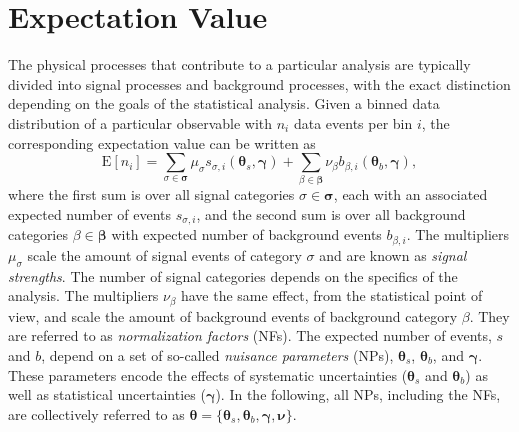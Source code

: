 \section{Expectation Value}
\label{sec:exp-value}
The physical processes that contribute to a particular analysis are typically divided into signal processes and background processes, with the exact distinction depending on the goals of the statistical analysis.
Given a binned data distribution of a particular observable with $n_i$ data events per bin $i$, the corresponding expectation value can be written as
\begin{equation}
    \text{E}[n_i] = \sum_{\sigma \in \pmb{\sigma}} \mu_\sigma s_{\sigma,i}(\pmb{\theta}_s, \pmb{\gamma}) + \sum_{\beta \in \pmb{\beta}} \nu_\beta b_{\beta,i}(\pmb{\theta}_b, \pmb{\gamma}),
\end{equation}
where the first sum is over all signal categories $\sigma \in \pmb{\sigma}$, each with an associated expected number of events $s_{\sigma, i}$, and the second sum is over all background categories $\beta \in \pmb{\beta}$ with expected number of background events $b_{\beta,i}$. 
The multipliers $\mu_\sigma$ scale the amount of signal events of category $\sigma$ and are known as \emph{signal strengths}. 
The number of signal categories depends on the specifics of the analysis. The multipliers $\nu_\beta$ have the same effect, from the statistical point of view, and scale the amount of background events of background category $\beta$. They are referred to as \emph{normalization factors} (NFs). 
The expected number of events, $s$ and $b$, depend on a set of so-called \emph{nuisance parameters} (NPs), $\pmb{\theta}_s$, $\pmb{\theta}_b$, and $\pmb{\gamma}$. These parameters encode the effects of systematic uncertainties ($\pmb{\theta}_s$ and $\pmb{\theta}_b$) as well as statistical uncertainties ($\pmb{\gamma}$). In the following, all NPs, including the NFs, are collectively referred to as $\pmb{\theta} = \{\pmb{\theta}_s, \pmb{\theta}_b, \pmb{\gamma}, \pmb{\nu}\}$. 

